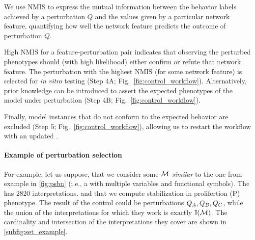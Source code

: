 We use NMIS to express the mutual information between the behavior labels achieved by a perturbation $Q$ and the values given by a particular network feature, quantifying how well the network feature predicts the outcome of perturbation $Q$.

High NMIS for a feature-perturbation pair indicates that observing the perturbed phenotypes should (with high likelihood) either confirm or refute that network feature. The perturbation with the highest NMIS (for some network feature) is selected for \emph{in vitro} testing (Step 4A; Fig.~\ref{fig:control_workflow}). Alternatively, prior knowledge can be introduced to assert the expected phenotypes of the model under perturbation (Step 4B; Fig.~\ref{fig:control_workflow}).

Finally, model instances that do not conform to the expected behavior are excluded (Step 5; Fig.~\ref{fig:control_workflow}), allowing us to restart the workflow with an updated \PBN{}.



\paragraph{Example of perturbation selection}

For example, let us suppose, that we consider some \PBN{} $\mathcal{M}$ \emph{similar} to the one from example in \autoref{fig:psbn} (i.e., a \PBN{} with multiple variables and functional symbols). The \PBN{} has 2820 interpretations. and that we compute stabilization in prolifertion (P) phenotype. The result of the control could be perturbations $Q_A, Q_B, Q_C$, while the union of the interpretations for which they work is exactly $\mathbb{I}(\mathcal{M})$. The cardinality and intersection of the interpretations they cover are shown in \autoref{subfig:set_example}. 


